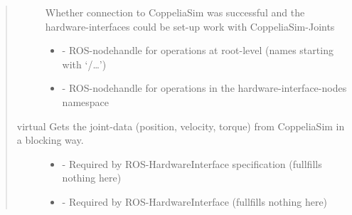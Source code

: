 \documentclass[letterpaper,10pt,english]{sphinxmanual}
\begin{document}
\begin{quote}
\begin{fulllineitems}
\begin{fulllineitems}
\begin{description}
\item[{}] \leavevmode

Whether connection to CoppeliaSim was successful and the hardware-interfaces could be set-up work with CoppeliaSim-Joints 


\item[{}] \leavevmode\begin{itemize}
\item {}  - 
ROS-nodehandle for operations at root-level (names starting with ‘/…’) 

\item {}  - 
ROS-nodehandle for operations in the hardware-interface-nodes namespace 

\end{itemize}

\end{description}


\end{fulllineitems}


\begin{fulllineitems}
\label{\detokenize{HardwareInterface:_CPPv2N21coppeliasim_interface17HardwareInterface4readERKN3ros4TimeERKN3ros8DurationE}}%
\pysigstartmultiline
virtual \label{\detokenize{HardwareInterface:project0classcoppeliasim__interface_1_1HardwareInterface_1abc05d9a9e8761462b2161a33f55203cc}}%
\pysigstopmultiline
Gets the joint-data (position, velocity, torque) from CoppeliaSim in a blocking way. 

\begin{description}
\item[{}] \leavevmode\begin{itemize}
\item {}  - 
Required by ROS-HardwareInterface specification (fullfills nothing here) 

\item {}  - 
Required by ROS-HardwareInterface (fullfills nothing here) 


\end{itemize}
\end{description}
\end{fulllineitems}
\end{fulllineitems}
\end{quote}
\end{document}
